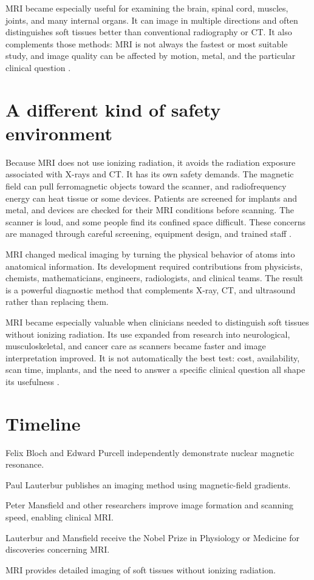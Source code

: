 \documentclass[12pt,oneside]{book}
\begin{document}
MRI became especially useful for examining the brain, spinal cord, muscles,
joints, and many internal organs. It can image in multiple directions and
often distinguishes soft tissues better than conventional radiography or
CT. It also complements those methods: MRI is not always the fastest or
most suitable study, and image quality can be affected by motion, metal,
and the particular clinical question \cite{fdaMRI}.

\section{A different kind of safety environment}
Because MRI does not use ionizing radiation, it avoids the radiation
exposure associated with X-rays and CT. It has its own safety demands. The
magnetic field can pull ferromagnetic objects toward the scanner, and
radiofrequency energy can heat tissue or some devices. Patients are
screened for implants and metal, and devices are checked for their MRI
conditions before scanning. The scanner is loud, and some people find its
confined space difficult. These concerns are managed through careful
screening, equipment design, and trained staff \cite{fdaMRI}.

MRI changed medical imaging by turning the physical behavior of atoms into
anatomical information. Its development required contributions from
physicists, chemists, mathematicians, engineers, radiologists, and clinical
teams. The result is a powerful diagnostic method that complements X-ray,
CT, and ultrasound rather than replacing them.

MRI became especially valuable when clinicians needed to distinguish soft
tissues without ionizing radiation. Its use expanded from research into
neurological, musculoskeletal, and cancer care as scanners became faster and
image interpretation improved. It is not automatically the best test: cost,
availability, scan time, implants, and the need to answer a specific clinical
question all shape its usefulness \cite{lauterbur1973,fdaMRI}.

\section*{Timeline}
\begin{description}[leftmargin=2.3cm,style=nextline]
  \item[1946] Felix Bloch and Edward Purcell independently demonstrate nuclear magnetic resonance.
  \item[1973] Paul Lauterbur publishes an imaging method using magnetic-field gradients.
  \item[1970s--1980s] Peter Mansfield and other researchers improve image formation and scanning speed, enabling clinical MRI.
  \item[2003] Lauterbur and Mansfield receive the Nobel Prize in Physiology or Medicine for discoveries concerning MRI.
  \item[Today] MRI provides detailed imaging of soft tissues without ionizing radiation.
\end{description}
\end{document}
